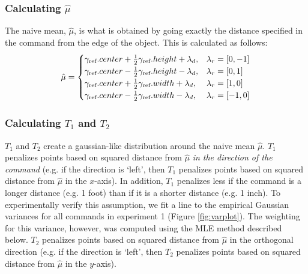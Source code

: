 \documentclass[12pt,letterpaper]{article}
\newcommand\refobj{\textmd{ref}}
\begin{document}
\subsubsection{Calculating $\hat{\mu}$}
The naive mean, $\hat{\mu}$, is what is obtained by going exactly the distance specified in the command from the edge of the object. This is calculated as follows:
\[
\hat{\mu} = \begin{cases} 
\gamma_\refobj.center + \frac{1}{2}\gamma_\refobj.height + \lambda_d, & \lambda_r = [0, -1] \\
\gamma_\refobj.center - \frac{1}{2}\gamma_\refobj.height - \lambda_d, & \lambda_r = [0, 1] \\
\gamma_\refobj.center + \frac{1}{2}\gamma_\refobj.width + \lambda_d, & \lambda_r = [1, 0] \\
\gamma_\refobj.center - \frac{1}{2}\gamma_\refobj.width - \lambda_d, & \lambda_r = [-1, 0] 
\end{cases}
\]

\subsubsection{Calculating $T_1$ and $T_2$}
$T_1$ and $T_2$ create a gaussian-like distribution around the naive mean $\hat{\mu}$. $T_1$ penalizes points based on squared distance from $\hat{\mu}$ \emph{in the direction of the command} (e.g. if the direction is `left', then $T_1$ penalizes points based on squared distance from $\hat{\mu}$ in the $x$-axis). In addition, $T_1$ penalizes less if the command is a longer distance (e.g. 1 foot) than if it is a shorter distance (e.g. 1 inch). To experimentally verify this assumption, we fit a line to the empirical Gaussian variances for all commands in experiment 1 (Figure \ref{fig:varplot}). The weighting for this variance, however, was computed using the MLE method described below. $T_2$ penalizes points based on squared distance from $\hat{\mu}$ in the orthogonal direction (e.g. if the direction is `left', then $T_2$ penalizes points based on squared distance from $\hat{\mu}$ in the $y$-axis). \\
\end{document}
